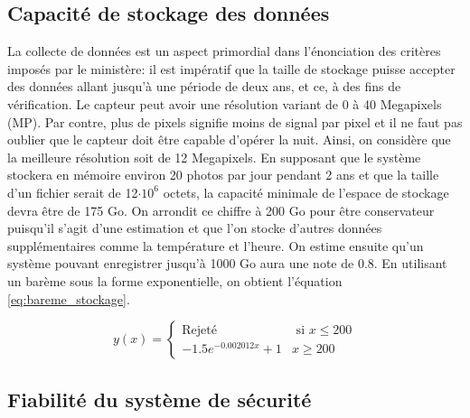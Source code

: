\subsection{Capacité de stockage des données}
\label{subsection:capacite_stockage}

La collecte de données est un aspect primordial dans l'énonciation des critères imposés par le ministère: il est impératif que la taille de stockage puisse accepter des données allant jusqu'à une période de deux ans, et ce, à des fins de vérification. Le capteur peut avoir une résolution variant de 0 à 40 Megapixels (MP). Par contre, plus de pixels signifie moins de signal par pixel et il ne faut pas oublier que le capteur doit être capable d'opérer la nuit. Ainsi, on considère que la meilleure résolution soit de 12 Megapixels. En supposant que le système stockera en mémoire environ 20 photos par jour pendant 2 ans et que la taille d'un fichier serait de 12$\cdot 10^6$ octets, la capacité minimale de l'espace de stockage devra être de 175 Go. On arrondit ce chiffre à 200 Go pour être conservateur puisqu'il s'agit d'une estimation et que l'on stocke d'autres données supplémentaires comme la température et l'heure. On estime ensuite qu'un système pouvant enregistrer jusqu'à 1000 Go aura une note de 0.8. En utilisant un barème sous la forme exponentielle, on obtient l'équation \ref{eq:bareme_stockage}.

\begin{equation}
    y(x) = \begin{cases}
        \text{Rejeté} & \text{ si } x \le 200 \\
        -1.5e^{-0.002012x} + 1 & x \geq 200
    \end{cases}
    \label{eq:bareme_stockage}
\end{equation}

\subsection{Fiabilité du système de sécurité}


